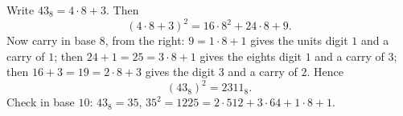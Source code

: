 Write $43_8=4\cdot8+3$. Then
\[
(4\cdot8+3)^2=16\cdot8^2+24\cdot8+9 .
\]
Now carry in base $8$, from the right: $9=1\cdot8+1$ gives the units digit $1$ and a carry of $1$; then $24+1=25=3\cdot8+1$ gives the eights digit $1$ and a carry of $3$; then $16+3=19=2\cdot8+3$ gives the digit $3$ and a carry of $2$. Hence
\[
\left(43_8\right)^2=\boxed{2311_8}.
\]
Check in base $10$: $43_8=35$, $35^2=1225=2\cdot512+3\cdot64+1\cdot8+1$.
